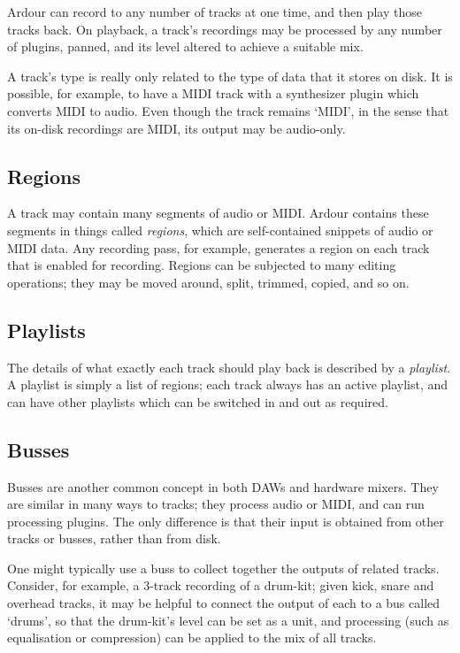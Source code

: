 \documentclass[10pt,a4paper]{book}
\begin{document}
Ardour can record to any number of tracks at one time, and then play
those tracks back.  On playback, a track's recordings may be processed
by any number of plugins, panned, and its level altered to achieve a
suitable mix.

\begin{danger}
A track's type is really only related to the type of data that it
stores on disk.  It is possible, for example, to have a MIDI track
with a synthesizer plugin which converts MIDI to audio.  Even though
the track remains `MIDI', in the sense that its on-disk recordings are
MIDI, its output may be audio-only.
\end{danger}


\subsection{Regions}

A track may contain many segments of audio or MIDI\@.  Ardour contains
these segments in things called \emph{regions}, which are
self-contained snippets of audio or MIDI data.  Any recording pass,
for example, generates a region on each track that is enabled for
recording.  Regions can be subjected to many editing operations; they
may be moved around, split, trimmed, copied, and so on.


\subsection{Playlists}

The details of what exactly each track should play back is described
by a \emph{playlist}.  A playlist is simply a list of regions; each
track always has an active playlist, and can have other playlists
which can be switched in and out as required.


\subsection{Busses}

Busses are another common concept in both DAWs and hardware mixers.
They are similar in many ways to tracks; they process audio or MIDI,
and can run processing plugins.  The only difference is that their
input is obtained from other tracks or busses, rather than from disk.

One might typically use a buss to collect together the outputs of
related tracks.  Consider, for example, a 3-track recording of a
drum-kit; given kick, snare and overhead tracks, it may be helpful to
connect the output of each to a bus called `drums', so that the
drum-kit's level can be set as a unit, and processing (such as
equalisation or compression) can be applied to the mix of all tracks.
\end{document}
